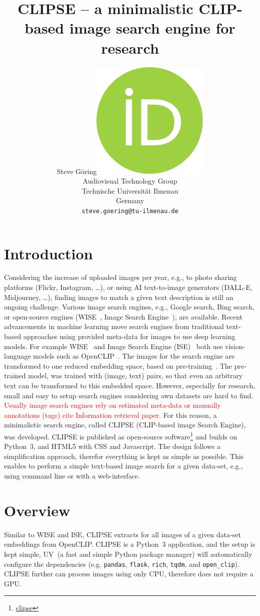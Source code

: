 \documentclass{article}
\title{CLIPSE -- a minimalistic CLIP-based image search engine for research}
\author{ Steve Göring\hspace{1mm}\href{https://orcid.org/0000-0001-6810-6969}{\includegraphics[scale=0.06]{orcid.pdf}}\\
    Audiovisual Technology Group\\
    Technische Universität Ilmenau\\
    Germany \\
    \texttt{steve.goering@tu-ilmenau.de} \\
}
\begin{document}
\maketitle

\begin{abstract}

\end{abstract}




\section{Introduction}
Considering the increase of uploaded images per year, e.g., to photo sharing platforms (Flickr, Instagram, \ldots), or using AI text-to-image generators (DALL-E, Midjourney, \ldots), finding images to match a given text description is still an ongoing challenge.
Various image search engines, e.g., Google search, Bing search, or open-source engines (WISE~\cite{wise}, Image Search Engine~\cite{ise}), are available.
Recent advancements in machine learning move search engines from traditional text-based approaches using provided meta-data for images to use deep learning models.
For example WISE~\cite{wise} and Image Search Engine (ISE)~\cite{ise} both use vision-language models such as OpenCLIP~\cite{ilharco_gabriel_2021_5143773,cherti2023reproducible,Radford2021LearningTV,schuhmann2022laionb}.
The images for the search engine are transformed to one reduced embedding space, based on pre-training~\cite{Radford2021LearningTV}.
The pre-trained model, was trained with (image, text) pairs, so that even an arbitrary text can be transformed to this embedded space.
However, especially for research, small and easy to setup search engines considering own datasets are hard to find.
\textcolor{red}{Usually image search engines rely on estimated meta-data or manually annotations (tags) cite Information retrieval paper.}
For this reason, a minimalistic search engine, called CLIPSE (CLIP-based image Search Engine), was developed.
CLIPSE is published as open-source software\footnote{\url{clipse}} and builds on Python~3, and HTML5 with CSS and Javascript.
The design follows a simplification approach, therefor everything is kept as simple as possible.
This enables to perform a simple text-based image search for a given data-set, e.g., using command line or with a web-interface.



\section{Overview}
Similar to WISE and ISE, CLIPSE extracts for all images of a given data-set embeddings from OpenCLIP.
CLIPSE is a Python~3 application, and the setup is kept simple, UV~\cite{uv}(a fast and simple Python package manager) will automatically configure the dependencies (e.g. \texttt{pandas}, \texttt{flask}, \texttt{rich}, \texttt{tqdm}, and \texttt{open\_clip}).
CLIPSE further can process images using only CPU, therefore does not require a GPU.
\end{document}
